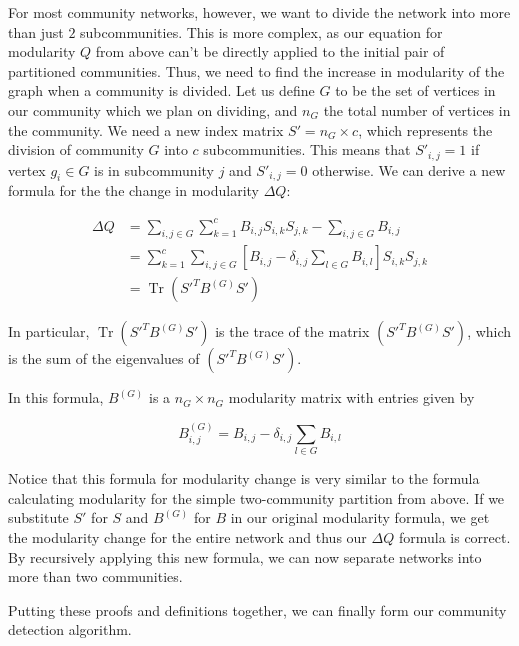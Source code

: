 \documentclass{article}
\DeclareMathOperator{\Tr}{Tr}
\begin{document}
For most community networks, however, we want to divide the network into more than just $2$ subcommunities.
This is more complex, as our equation for modularity $Q$ from above can't be directly applied to the initial pair of partitioned communities.
Thus, we need to find the increase in modularity of the graph when a community is divided. 
Let us define $G$ to be the set of vertices in our community which we plan on dividing, and $n_G$ the total number of vertices in the community.
We need a new index matrix $S' = n_G \times c$, which represents the division of community $G$ into $c$ subcommunities.
This means that $S'_{i,j} = 1$ if vertex $g_i \in G$ is in subcommunity $j$ and $S'_{i,j} = 0$ otherwise. 
We can derive a new formula for the the change in modularity $\Delta Q$:

\begin{equation} \label{eq1}
\begin{split}
\Delta Q & = \sum_{i, j \in G} \sum_{k=1}^{c} B_{i,j} S_{i,k} S_{j, k} - \sum_{i, j \in G} B_{i,j} \\
 & = \sum_{k=1}^{c} \sum_{i, j \in G} [ B_{i, j} - \delta_{i, j} \sum_{l \in G} B_{i,l}]S_{i,k} S_{j, k} \\
 & = \Tr (S'^TB^{(G)}S')
\end{split}
\end{equation}

\bigskip

In particular, $\Tr (S'^TB^{(G)}S')$ is the trace of the matrix $(S'^TB^{(G)}S')$, which is the sum of the eigenvalues of $(S'^TB^{(G)}S')$.

\bigskip

\noindent In this formula, $B^{(G)}$ is a $n_G \times n_G$ modularity matrix with entries given by

$$ B^{(G)}_{i, j} = B_{i,j} - \delta_{i, j} \sum_{l \in G} B_{i,l}$$

Notice that this formula for modularity change is very similar to the formula calculating modularity for the simple two-community partition from above.
If we substitute $S'$ for $S$ and $B^{(G)}$ for $B$ in our original modularity formula, we get the modularity change for the entire network and thus our $\Delta Q$ formula is correct.
By recursively applying this new formula, we can now separate networks into more than two communities.

\bigskip

Putting these proofs and definitions together, we can finally form our community detection algorithm.
\end{document}
